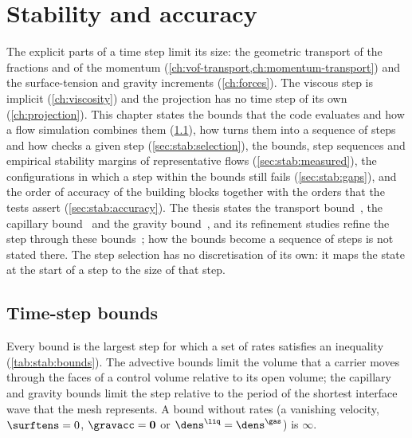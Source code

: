 \chapter{Stability and accuracy}\label{ch:stability-accuracy}
The explicit parts of a time step limit its size: the geometric transport of
the fractions and of the momentum
(\cref{ch:vof-transport,ch:momentum-transport}) and the surface-tension and
gravity increments (\cref{ch:forces}). The viscous step is implicit
(\cref{ch:viscosity}) and the projection has no time step of its own
(\cref{ch:projection}). This chapter states the bounds that the code
evaluates and how a flow simulation combines them
(\cref{sec:stab:bounds}), how  turns them into a sequence
of steps and how  checks a given step
(\cref{sec:stab:selection}), the bounds, step sequences and empirical
stability margins of representative flows (\cref{sec:stab:measured}), the
configurations in which a step within the bounds still fails
(\cref{sec:stab:gaps}), and the order of accuracy of the building blocks
together with the orders that the tests assert (\cref{sec:stab:accuracy}).
The thesis states the transport bound~, the
capillary bound~ and the gravity
bound~, and its refinement studies refine the step through
these bounds~; how the bounds become a sequence of steps is not
stated there. The step selection has no discretisation of its own: it maps
the state at the start of a step to the size of that step.

\section{Time-step bounds}\label{sec:stab:bounds}
Every bound is the largest step for which a set of rates satisfies an
inequality (\cref{tab:stab:bounds}). The advective bounds limit the volume
that a carrier moves through the faces of a control volume relative to its
open volume; the capillary and gravity bounds limit the step relative to the
period of the shortest interface wave that the mesh represents. A bound
without rates (a vanishing velocity, $\surftens=0$, $\gravacc=\mathbf{0}$ or
$\dens^{\liq}=\dens^{\gas}$) is $\infty$.

